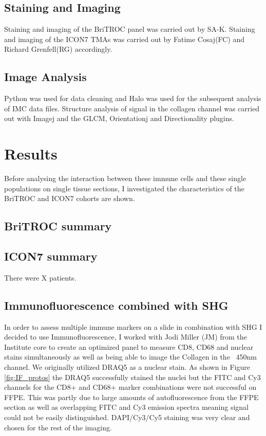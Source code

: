 \subsection{Staining and Imaging}
Staining and imaging of the BriTROC panel was carried out by SA-K. Staining and imaging of the ICON7 TMAs was carried out by Fatime Cosaj(FC) and Richard Grenfell(RG) accordingly.

\subsection{Image Analysis}
Python was used for data cleaning and Halo was used for the subsequent analysis of IMC data files. Structure analysis of signal in the collagen channel was carried out with Imagej and the GLCM, Orientationj and Directionality plugins. 


\section{Results}
Before analysing the interaction between these immune cells and these single populations on single tissue sections, I investigated the characteristics of the BriTROC and ICON7 cohorts are shown.

\subsection{BriTROC summary}
\subsection{ICON7 summary}
There were X patients.


\subsection{Immunofluorescence combined with SHG}
In order to assess multiple immune markers on a slide in combination with SHG I decided to use Immunofluorescence, I worked with Jodi Miller (JM) from the Institute core to create an optimized panel to measure CD8, CD68 and nuclear stains simultaneously as well as being able to image the Collagen in the ~450nm channel. We originally utilized DRAQ5 as a nuclear stain. As shown in Figure \ref{fig:IF_protos} the DRAQ5 successfully stained the nuclei but the FITC and Cy3 channels for the CD8+ and CD68+ marker combinations were not successful on FFPE. This was partly due to large amounts of autofluorescence from the FFPE section as well as overlapping FITC and Cy3 emission spectra meaning signal could not be easily distinguished. DAPI/Cy3/Cy5 staining was very clear and chosen for the rest of the imaging.

